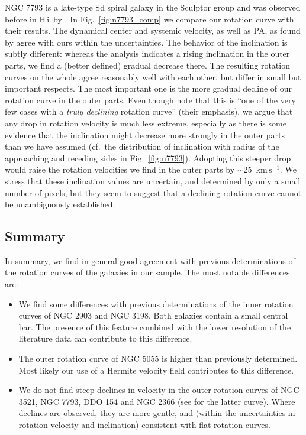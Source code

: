 \documentclass[usenatbib,usegraphicx,apjfonts,floatfix]{emulateapj}
\newcommand{\kms}{\ensuremath{\,\mbox{km}\,\mbox{s}^{-1}}}
\newcommand{\HI}{H\,{\sc i}}
\begin{document}
NGC 7793 is a late-type Sd spiral galaxy in the Sculptor group and was
observed before in \HI\ by \citet{carignan90}.  In
Fig.\ \ref{fig:n7793_comp} we compare our rotation curve with their
results.  The dynamical center and systemic velocity, as well as PA,
as found by \citet{carignan90} agree with ours within the
uncertainties.  The behavior of the inclination is subtly different:
whereas the \citet{carignan90} analysis indicates a rising inclination
in the outer parts, we find a (better defined) gradual decrease there.
The resulting rotation curves on the whole agree reasonably well with
each other, but differ in small but important respects. The most
important one is the more gradual decline of our rotation curve in the
outer parts. Even though \citet{carignan90} note that this is ``one of
the very few cases with a \emph{truly declining} rotation curve''
(their emphasis), we argue that any drop in rotation velocity is much
less extreme, especially as there is some evidence that the inclination
might decrease more strongly in the outer parts than we have assumed
(cf.\ the distribution of inclination with radius of the approaching
and receding sides in Fig.\ \ref{fig:n7793}). Adopting this steeper
drop would raise the rotation velocities we find in the outer parts by
$\sim 25$ \kms. We stress that these inclination values are uncertain,
and determined by only a small number of pixels, but they seem to
suggest that a declining rotation curve cannot be unambiguously
established.

\subsection{Summary}

In summary, we find in general good agreement with previous
determinations of the rotation curves of the galaxies in our
sample. The most notable differences are:
\begin{itemize}

\item We find some differences with previous determinations of the
  inner rotation curves of NGC 2903 and NGC 3198. Both galaxies
  contain a small central bar. The presence of this feature combined
  with the lower resolution of the literature data can contribute to
  this difference.

\item The outer rotation curve of NGC 5055 is higher than previously
  determined. Most likely our use of a Hermite velocity field
  contributes to this difference.

\item We do not find steep declines in velocity in the outer rotation
  curves of NGC 3521, NGC 7793, DDO 154 and NGC 2366 (see
  \citealt{oh2007} for the latter curve). Where declines are observed,
  they are more gentle, and (within the uncertainties in rotation
  velocity and inclination) consistent with flat rotation curves.
\end{itemize}
\end{document}
